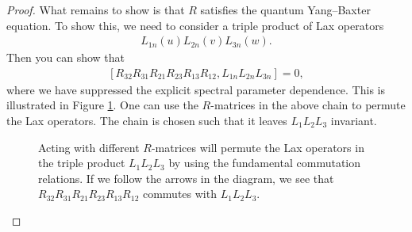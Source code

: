 \documentclass{article}
\begin{document}
\begin{proof}
\medskip

What remains to show is that $R$ satisfies the quantum Yang--Baxter equation. To show this, we need to consider a triple product of Lax operators
%
\begin{align}
L_{1n}(u)L_{2n}(v)L_{3n}(w).
\end{align}
%
Then you can show that 
%
\begin{align}\label{eq:RRRRRR}
[R_{32}R_{31}R_{21}R_{23}R_{13}R_{12} , L_{1n}L_{2n}L_{3n}]=0,
\end{align}
%
where we have suppressed the explicit spectral parameter dependence. This is illustrated in Figure \ref{FigYBE}. One can use the $R$-matrices in the above chain to permute the Lax operators. The chain is chosen such that it leaves $L_1L_2L_3$ invariant.
%
\begin{figure}[h!]
\begin{center}
\end{center}
\caption{Acting with different $R$-matrices will permute the Lax operators in the triple product $L_1L_2L_3$ by using the fundamental commutation relations. If we follow the arrows in the diagram, we see that $R_{32}R_{31}R_{21}R_{23}R_{13}R_{12}$ commutes with $L_1L_2L_3$. }\label{FigYBE}
\end{figure}
%


\end{proof}
\end{document}

